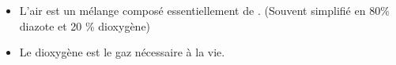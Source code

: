 \begin{mybilan}
	\begin{itemize}
		\item L'air est un mélange composé essentiellement de . (Souvent simplifié en 80\% diazote et 20 \% dioxygène)
		\item Le dioxygène est le gaz nécessaire à la vie.
	\end{itemize}
\end{mybilan}